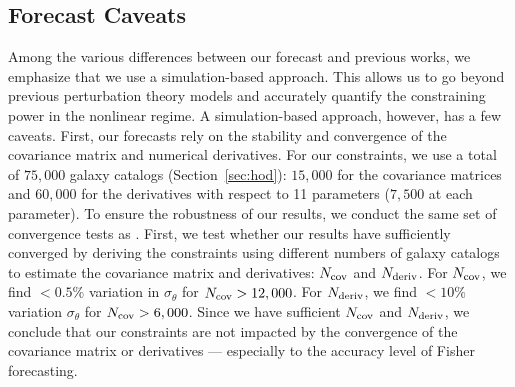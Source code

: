\subsection{Forecast Caveats}
Among the various differences between our forecast and previous works, we
emphasize that we use a simulation-based approach. This allows us to go beyond previous
perturbation theory models and accurately quantify the constraining power
in the nonlinear regime. A simulation-based approach, however, has a few caveats. 
First, our forecasts rely on the stability and convergence of the covariance 
matrix and numerical derivatives. 
For our constraints, we use a total of $75,000$ galaxy catalogs (Section~\ref{sec:hod}): 
$15,000$ for the covariance matrices and $60,000$ for the derivatives with 
respect to 11 parameters ($7,500$ at each parameter). To ensure the robustness
of our results, we conduct the same set of convergence tests as
\cite{hahn2020}. 
First, we test whether our results have sufficiently converged by deriving the 
constraints using different numbers of galaxy catalogs to estimate the covariance 
matrix and derivatives: $N_{\rm cov}$ and $N_{\rm deriv}$. For $N_{\rm cov}$,
we find $< 0.5\%$ variation in $\sigma_\theta$ for $N_{\rm cov} > 12,000$.
For $N_{\rm deriv}$, 
we find $< 10\%$ variation $\sigma_\theta$ for $N_{\rm cov} > 6,000$.
Since we have sufficient $N_{\rm cov}$ and $N_{\rm deriv}$, we conclude that 
our constraints are not impacted by the convergence of the covariance matrix 
or derivatives --- especially to the accuracy level of Fisher forecasting. 

